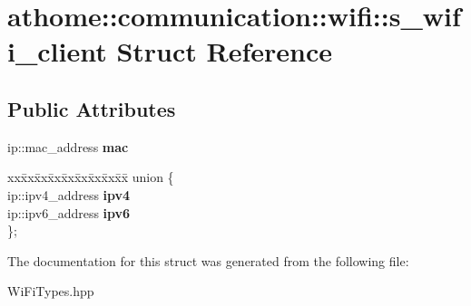\hypertarget{structathome_1_1communication_1_1wifi_1_1s__wifi__client}{}\section{athome\+:\+:communication\+:\+:wifi\+:\+:s\+\_\+wifi\+\_\+client Struct Reference}
\label{structathome_1_1communication_1_1wifi_1_1s__wifi__client}
\subsection*{Public Attributes}
\begin{DoxyCompactItemize}
\item 
\mbox{\label{structathome_1_1communication_1_1wifi_1_1s__wifi__client_a47f84e7a3151ffbd74d4c92a5aa74f2d}} 
ip\+::mac\+\_\+address {\bfseries mac}
\item 
\mbox{\label{structathome_1_1communication_1_1wifi_1_1s__wifi__client_a0fc3a6574b5350548c665c79adce737f}} 
\begin{tabbing}
xx\=xx\=xx\=xx\=xx\=xx\=xx\=xx\=xx\=\kill
union \{\\
\>ip::ipv4\_address {\bfseries ipv4}\\
\>ip::ipv6\_address {\bfseries ipv6}\\
\}; \\

\end{tabbing}\end{DoxyCompactItemize}


The documentation for this struct was generated from the following file\+:\begin{DoxyCompactItemize}
\item 
Wi\+Fi\+Types.\+hpp\end{DoxyCompactItemize}
